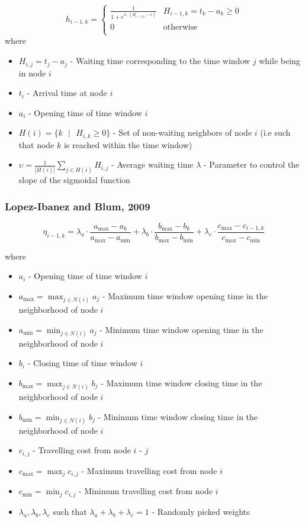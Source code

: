 \begin{homeworkProblem}
\begin{equation}
h_{i-1,k} = \begin{cases}
 \frac{1}{1+e^{\lambda \cdot (H_{i-1,k} - \upsilon)}}  &  H_{i-1,k} = t_k - a_k \geq 0 \\
0 & \text{otherwise} \\
\end{cases}
\end{equation}
where
\begin{itemize}
  \item $H_{i,j} = t_j - a_j$ - Waiting time corresponding to the time window $j$ while being in node $i$
  \item $t_i$ - Arrival time at node $i$
  \item $a_i$ - Opening time of time window $i$
  \item $H(i) = \{k\text{ } | \text{ }H_{i,k} \geq 0\}$ - Set of non-waiting neighbors of node $i$ (i.e such that node $k$ is reached within the time window)
  \item $\upsilon = \frac{1}{|H(i)|}\sum_{j \in H(i)}  H_{i,j}$ - Average waiting time 
  $\lambda$ - Parameter to control the slope of the sigmoidal function 
\end{itemize}


\subsubsection{Lopez-Ibanez and Blum, 2009}

\begin{equation}
\eta_{i-1,k} = \lambda_{a} \cdot \frac{a_{\max}-a_{k}}{a_{\max}-a_{\min}} + \lambda_{b} \cdot \frac{b_{\max}-b_{k}}{b_{\max}-b_{\min}} + \lambda_{c} \cdot \frac{c_{\max}-c_{i-1,k}}{c_{\max}-c_{\min}}
\end{equation}

where
\begin{itemize}
  \item $a_i$ - Opening time of time window $i$
  \item $a_{\max} = \max_{j \in N(i)} a_{j}$ - Maximum time window opening time in the neighborhood of node $i$
  \item $a_{\min} = \min_{j \in N(i)} a_{j}$ - Minimum time window opening time in the neighborhood of node $i$
  \item $b_i$ - Closing time of time window $i$
  \item $b_{\max} = \max_{j \in N(i)} b_{j}$ - Maximum time window closing time in the neighborhood of node $i$
  \item $b_{\min} = \min_{j \in N(i)} b_{j}$ - Minimum time window closing time in the neighborhood of node $i$
  \item $c_{i,j}$ - Travelling cost from node $i$ - $j$
  \item $c_{\max} = \max_j c_{i,j}$ - Maximum travelling cost from node $i$ 
  \item $c_{\min} = \min_j c_{i,j}$ - Minimum travelling cost from node $i$
  \item $\lambda_{a},\lambda_{b},\lambda_{c}$ such that $\lambda_{a}+\lambda_{b}+\lambda_{c}=1$ - Randomly picked weights
\end{itemize}



\end{homeworkProblem}
